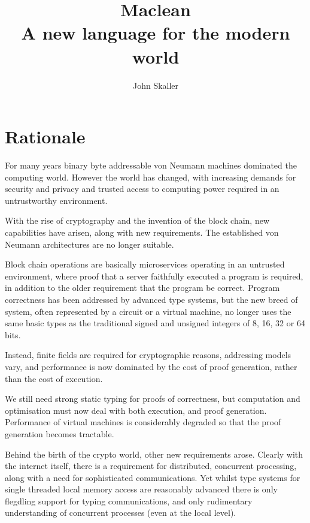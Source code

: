 \documentclass[oneside]{book}
\title{Maclean\\ A new language for the modern world}
\author{John Skaller}
\theoremstyle{plain}
\theoremstyle{definition}
\theoremstyle{plain}
\begin{document}
\maketitle
\tableofcontents
\chapter{Rationale}
For many years binary byte addressable von Neumann machines dominated the computing world.
However the world has changed, with increasing demands for security and privacy and
trusted access to computing power required in an untrustworthy environment.

\begin{xcomment}
With the rise of cryptography and the invention of the block chain, new capabilities
have arisen, along with new requirements. The established von Neumann architectures
are no longer suitable.
\end{xcomment}

Block chain operations are basically microservices operating in an untrusted environment,
where proof that a server faithfully executed a program is required, in addition to the
older requirement that the program be correct. Program correctness has been addressed
by advanced type systems, but the new breed of system, often represented by a circuit
or a virtual machine, no longer uses the same basic types as the traditional signed
and unsigned integers of 8, 16, 32 or 64 bits.

Instead, finite fields are required for cryptographic reasons, addressing models vary,
and performance is now dominated by the cost of proof generation, rather than the
cost of execution.

We still need strong static typing for proofs of correctness, but computation and
optimisation must now deal with both execution, and proof generation. Performance
of virtual machines is considerably degraded so that the proof generation becomes
tractable.

\begin{xcomment}
Behind the birth of the crypto world, other new requirements arose. 
Clearly with the internet itself, there is a requirement for distributed,
concurrent processing, along with a need for sophisticated communications.
Yet whilst type systems for single threaded local memory access are
reasonably advanced there is only flegdling support for typing
communications, and only rudimentary understanding of concurrent
processes (even at the local level).
\end{xcomment}
\end{document}
